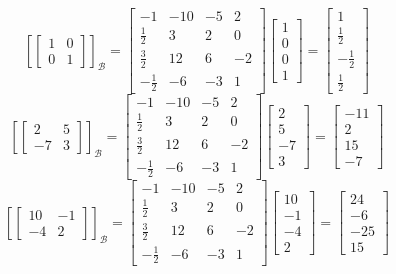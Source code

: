 \documentclass[a4paper,12pt]{article}
\begin{document}
$$
\left [  \begin{bmatrix} 1 & 0 \\ 0 & 1 \end{bmatrix} \right ]_{\mathcal{B}} =
\begin{bmatrix}
    -1 & -10 & -5 & 2 \\ 
    \frac{1}{2} & 3 & 2 & 0 \\
    \frac{3}{2} & 12 & 6 & -2 \\ 
    -\frac{1}{2} & -6 & -3 & 1
\end{bmatrix}
\begin{bmatrix} 1 \\ 0 \\ 0 \\ 1 \end{bmatrix}
=
\begin{bmatrix} 1 \\ \frac{1}{2} \\ -\frac{1}{2} \\ \frac{1}{2} \end{bmatrix}
$$
$$
\left [  \begin{bmatrix} 2 & 5 \\ -7 & 3 \end{bmatrix} \right ]_{\mathcal{B}} =
\begin{bmatrix}
    -1 & -10 & -5 & 2 \\ 
    \frac{1}{2} & 3 & 2 & 0 \\
    \frac{3}{2} & 12 & 6 & -2 \\ 
    -\frac{1}{2} & -6 & -3 & 1
\end{bmatrix}
\begin{bmatrix} 2 \\ 5 \\ -7 \\ 3 \end{bmatrix}
=
\begin{bmatrix} -11 \\ 2 \\ 15 \\ -7 \end{bmatrix}
$$
$$
\left [  \begin{bmatrix} 10 & -1 \\ -4 & 2 \end{bmatrix} \right ]_{\mathcal{B}} =
\begin{bmatrix}
    -1 & -10 & -5 & 2 \\ 
    \frac{1}{2} & 3 & 2 & 0 \\
    \frac{3}{2} & 12 & 6 & -2 \\ 
    -\frac{1}{2} & -6 & -3 & 1
\end{bmatrix}
\begin{bmatrix} 10 \\ -1 \\ -4 \\ 2 \end{bmatrix}
=
\begin{bmatrix} 24 \\ -6 \\ -25 \\ 15 \end{bmatrix}
$$
    
\end{document}
